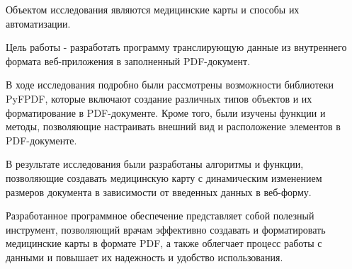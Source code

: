 \abstract %


Объектом исследования являются медицинские карты и способы их автоматизации.

Цель работы - разработать программу транслирующую данные из внутреннего формата веб-приложения в заполненный PDF-документ.

В ходе исследования подробно были рассмотрены возможности библиотеки PyFPDF, которые включают создание различных типов объектов и их форматирование в PDF-документе. Кроме того, были изучены функции и методы, позволяющие настраивать внешний вид и расположение элементов в PDF-документе.

В результате исследования были разработаны алгоритмы и функции, позволяющие создавать медицинскую карту с динамическим изменением размеров документа в зависимости от введенных данных в веб-форму.

Разработанное программное обеспечение представляет собой полезный инструмент, позволяющий врачам эффективно создавать и форматировать медицинские карты в формате PDF, а также облегчает процесс работы с данными и повышает их надежность и удобство использования.
